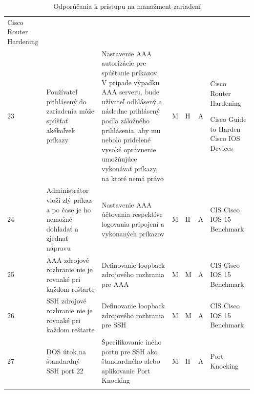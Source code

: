 \begin{longtable}[!htbp]{|C{2.5em}L{9em}L{9em}C{2em}C{2.5em}C{7.5em}L{10em}|}
	Cisco Router Hardening \cite{Graesser2001}	\\
	 23	&Používateľ prihlásený do zariadenia môže spúšťať akékoľvek príkazy	&Nastavenie AAA autorizácie pre spúštanie príkazov. V prípade výpadku AAA serveru, bude užívateľ odhlásený a následne prihlásený podľa  záložného prihlásenia, aby mu nebolo pridelené vysoké oprávnenie umožňujúce vykonávať príkazy, na ktoré nemá právo	&M	&H	&A	&Cisco Router Hardening \cite{Graesser2001}
	
	Cisco Guide to Harden Cisco IOS Devices \cite{Singh2018}	\\
	24	&Administrátor vloží zlý príkaz a po čase je ho nemožné dohľadať a zjednať nápravu	&Nastavenie AAA účtovania respektíve logovania pripojení a vykonaných príkazov	&M	&H	&A	&CIS Cisco IOS 15 Benchmark \cite{CIS_DrTLsgXv24lxeIIM}	\\
	 25	&AAA zdrojové rozhranie nie je rovnaké pri každom reštarte	&Definovanie loopback zdrojového rozhrania pre AAA	&M	&M	&A	&CIS Cisco IOS 15 Benchmark \cite{CIS_DrTLsgXv24lxeIIM}	\\
	26	&SSH zdrojové rozhranie nie je rovnaké pri každom reštarte	& Definovanie loopback zdrojového rozhrania pre SSH	&M	&M	&A	&CIS Cisco IOS 15 Benchmark \cite{CIS_DrTLsgXv24lxeIIM}	\\
	 27	&DOS útok na štandardný SSH port 22	&Špecifikovanie iného portu pre SSH ako štandardného alebo aplikovanie Port Knocking \cite{MJVmQiKUgZl92S8u}	&M	&H	&A	&Port Knocking \cite{MJVmQiKUgZl92S8u}	\\
	
	\hline
	\caption{Odporúčania k prístupu na manažment zariadení}
	\label{tab:managemnet}%
\end{longtable}%

